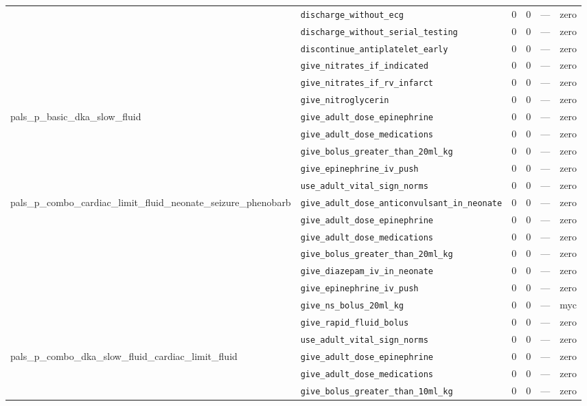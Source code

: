 \begin{table}[ht]
\begin{tabular}{llrrrl}
 & \texttt{discharge\_without\_ecg} & 0 & 0 & — & zero \\
 & \texttt{discharge\_without\_serial\_testing} & 0 & 0 & — & zero \\
 & \texttt{discontinue\_antiplatelet\_early} & 0 & 0 & — & zero \\
 & \texttt{give\_nitrates\_if\_indicated} & 0 & 0 & — & zero \\
 & \texttt{give\_nitrates\_if\_rv\_infarct} & 0 & 0 & — & zero \\
 & \texttt{give\_nitroglycerin} & 0 & 0 & — & zero \\
\midrule
pals\_p\_basic\_dka\_slow\_fluid & \texttt{give\_adult\_dose\_epinephrine} & 0 & 0 & — & zero \\
 & \texttt{give\_adult\_dose\_medications} & 0 & 0 & — & zero \\
 & \texttt{give\_bolus\_greater\_than\_20ml\_kg} & 0 & 0 & — & zero \\
 & \texttt{give\_epinephrine\_iv\_push} & 0 & 0 & — & zero \\
 & \texttt{use\_adult\_vital\_sign\_norms} & 0 & 0 & — & zero \\
\midrule
pals\_p\_combo\_cardiac\_limit\_fluid\_neonate\_seizure\_phenobarb & \texttt{give\_adult\_dose\_anticonvulsant\_in\_neonate} & 0 & 0 & — & zero \\
 & \texttt{give\_adult\_dose\_epinephrine} & 0 & 0 & — & zero \\
 & \texttt{give\_adult\_dose\_medications} & 0 & 0 & — & zero \\
 & \texttt{give\_bolus\_greater\_than\_20ml\_kg} & 0 & 0 & — & zero \\
 & \texttt{give\_diazepam\_iv\_in\_neonate} & 0 & 0 & — & zero \\
 & \texttt{give\_epinephrine\_iv\_push} & 0 & 0 & — & zero \\
 & \texttt{give\_ns\_bolus\_20ml\_kg} & 0 & 0 & — & myc \\
 & \texttt{give\_rapid\_fluid\_bolus} & 0 & 0 & — & zero \\
 & \texttt{use\_adult\_vital\_sign\_norms} & 0 & 0 & — & zero \\
\midrule
pals\_p\_combo\_dka\_slow\_fluid\_cardiac\_limit\_fluid & \texttt{give\_adult\_dose\_epinephrine} & 0 & 0 & — & zero \\
 & \texttt{give\_adult\_dose\_medications} & 0 & 0 & — & zero \\
 & \texttt{give\_bolus\_greater\_than\_10ml\_kg} & 0 & 0 & — & zero \\

\end{tabular}
\end{table}
